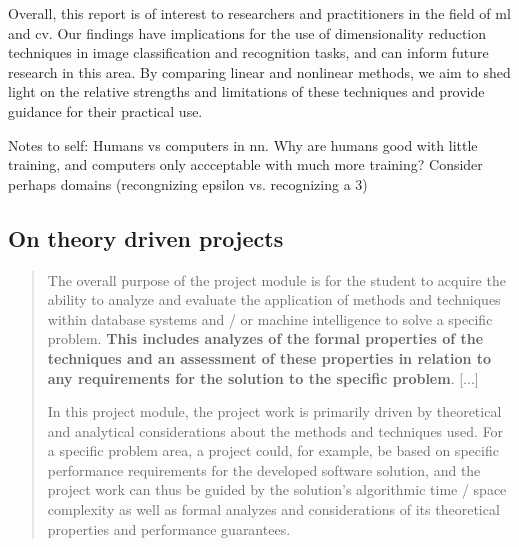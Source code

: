 Overall, this report is of interest to researchers and practitioners in the field of \gls{ml} and \gls{cv}. Our findings have implications for the use of dimensionality reduction techniques in image classification and recognition tasks, and can inform future research in this area. By comparing linear and nonlinear methods, we aim to shed light on the relative strengths and limitations of these techniques and provide guidance for their practical use.





Notes to self: Humans vs computers in \gls{nn}. Why are humans good with little training, and computers only accceptable with much more training? Consider perhaps domains (recongnizing epsilon vs. recognizing a 3)


\subsection*{On theory driven projects}
\blockcquote{Projectmodule}{The overall purpose of the project module is for the student to acquire the ability to analyze and evaluate the application of methods and techniques within database systems and / or machine intelligence to solve a specific problem. \textbf{This includes analyzes of the formal properties of the techniques and an assessment of these properties in relation to any requirements for the solution to the specific problem}. [...]

In this project module, the project work is primarily driven by theoretical and analytical considerations about the methods and techniques used. For a specific problem area, a project could, for example, be based on specific performance requirements for the developed software solution, and the project work can thus be guided by the solution's algorithmic time / space complexity as well as formal analyzes and considerations of its theoretical properties and performance guarantees.}



